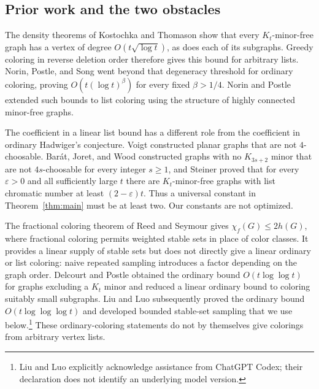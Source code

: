 \subsection{Prior work and the two obstacles}

The density theorems of Kostochka \cite{Kostochka1982,Kostochka1984}
and Thomason \cite{Thomason1984} show that every $K_t$-minor-free graph
has a vertex of degree $O(t\sqrt{\log t})$, as does each of its
subgraphs. Greedy coloring in reverse deletion order therefore gives
this bound for arbitrary lists. Norin, Postle, and Song
\cite{NorinPostleSong2023} went beyond that degeneracy threshold for
ordinary coloring, proving $O(t(\log t)^\beta)$ for every fixed
$\beta>1/4$. Norin and Postle \cite{NorinPostle2023} extended such
bounds to list coloring using the structure of highly connected
minor-free graphs.

The coefficient in a linear list bound has a different role from the
coefficient in ordinary Hadwiger's conjecture. Voigt
\cite{Voigt1993} constructed planar graphs that are not $4$-choosable.
Bar\'at, Joret, and Wood \cite{BaratJoretWood2011} constructed graphs
with no $K_{3s+2}$ minor that are not $4s$-choosable for every integer
$s\ge1$, and Steiner
\cite{Steiner2022List} proved that for every $\varepsilon>0$ and all
sufficiently large $t$ there are $K_t$-minor-free graphs with list
chromatic number at least $(2-\varepsilon)t$. Thus a universal constant
in Theorem~\ref{thm:main} must be at least two. Our constants are not
optimized.

The fractional coloring theorem of Reed and Seymour
\cite{ReedSeymour1998} gives $\chi_f(G)\le2h(G)$, where fractional
coloring permits weighted stable sets in place of color classes. It
provides a linear supply of stable sets but does not directly give a
linear ordinary or list coloring: naive repeated sampling introduces a
factor depending on the graph order. Delcourt and Postle
\cite{DelcourtPostle2021} obtained the ordinary bound
$O(t\log\log t)$ for graphs excluding a $K_t$ minor and reduced a linear
ordinary bound to coloring suitably small subgraphs. Liu and Luo
\cite{LiuLuo2026} subsequently proved the ordinary bound
$O(t\log\log\log t)$ and developed bounded stable-set sampling that we
use below.\footnote{Liu and Luo explicitly acknowledge assistance from
ChatGPT Codex; their declaration does not identify an underlying model
version.} These ordinary-coloring statements do not by themselves give
colorings from arbitrary vertex lists.

